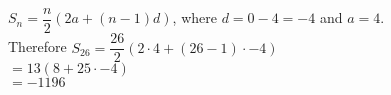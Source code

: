 $S_n=\dfrac{n}{2}(2a+(n-1)d)$, where $d=0-4=-4$ and $a=4$.\\Therefore $S_{26}=\dfrac{26}{2}(2\cdot 4 +(26-1)\cdot -4)$\\$=13(8+25 \cdot-4)$\\$=-1196$